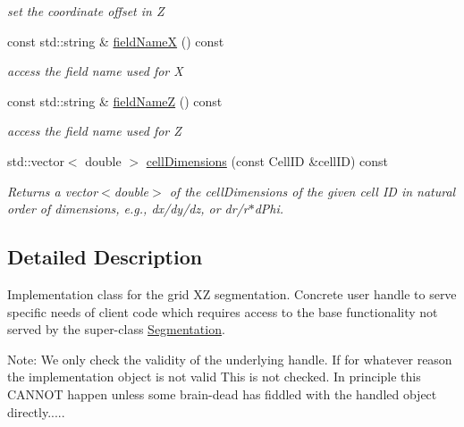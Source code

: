 \begin{DoxyCompactItemize}
\begin{DoxyCompactList}\small\item\em set the coordinate offset in Z \item\end{DoxyCompactList}\item 
const std::string \& \hyperlink{class_d_d4hep_1_1_geometry_1_1_cartesian_grid_x_z_a13e87762dd76ef23cf8949d2b677d4b1}{fieldNameX} () const 
\begin{DoxyCompactList}\small\item\em access the field name used for X \item\end{DoxyCompactList}\item 
const std::string \& \hyperlink{class_d_d4hep_1_1_geometry_1_1_cartesian_grid_x_z_ab211910357d8652983b32f7f2aabf1fb}{fieldNameZ} () const 
\begin{DoxyCompactList}\small\item\em access the field name used for Z \item\end{DoxyCompactList}\item 
std::vector$<$ double $>$ \hyperlink{class_d_d4hep_1_1_geometry_1_1_cartesian_grid_x_z_a5cfaa712b3469600040d85229159af8e}{cellDimensions} (const CellID \&cellID) const 
\begin{DoxyCompactList}\small\item\em Returns a vector$<$double$>$ of the cellDimensions of the given cell ID in natural order of dimensions, e.g., dx/dy/dz, or dr/r$\ast$dPhi. \item\end{DoxyCompactList}\end{DoxyCompactItemize}


\subsection{Detailed Description}
Implementation class for the grid XZ segmentation. Concrete user handle to serve specific needs of client code which requires access to the base functionality not served by the super-\/class \hyperlink{class_d_d4hep_1_1_geometry_1_1_segmentation}{Segmentation}.

Note: We only check the validity of the underlying handle. If for whatever reason the implementation object is not valid This is not checked. In principle this CANNOT happen unless some brain-\/dead has fiddled with the handled object directly.....

